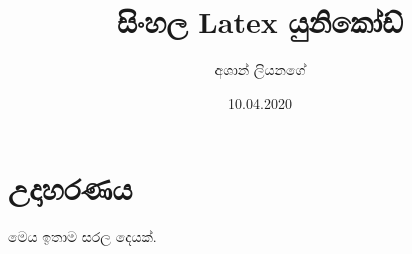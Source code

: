 \documentclass[12pt]{article}
\title{සිංහල Latex යුනිකෝඩ්}
\author{අශාන් ලියනගේ}
\date{10.04.2020}
\begin{document}
\maketitle


\section{උදාහරණය}
මෙය ඉතාම සරල දෙයක්. 
\end{document}
